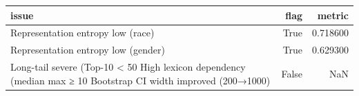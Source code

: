 \begin{tabular}{lrr}
\toprule
issue & flag & metric \\
\midrule
Representation entropy low (race) & True & 0.718600 \\
Representation entropy low (gender) & True & 0.629300 \\
Long-tail severe (Top-10 < 50%
High lexicon dependency (median max ≥ 10%
Bootstrap CI width improved (200→1000) & False & NaN \\
\bottomrule
\end{tabular}
